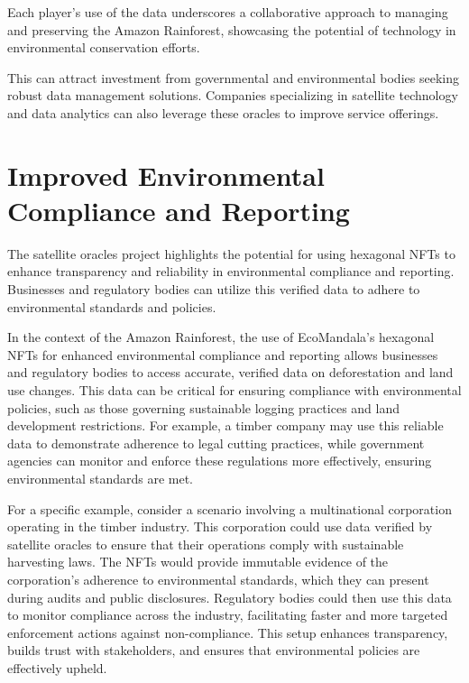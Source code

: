 \documentclass{scrreport}
\begin{document}
Each player's use of the data underscores a collaborative approach to managing and preserving the Amazon Rainforest, showcasing the potential of technology in environmental conservation efforts.

This can attract investment from governmental and environmental bodies seeking robust data management solutions. Companies specializing in satellite technology and data analytics can also leverage these oracles to improve service offerings.

\section{Improved Environmental Compliance and Reporting}

The satellite oracles project highlights the potential for using hexagonal NFTs to enhance transparency and reliability in environmental compliance and reporting. Businesses and regulatory bodies can utilize this verified data to adhere to environmental standards and policies.

In the context of the Amazon Rainforest, the use of EcoMandala’s hexagonal NFTs for enhanced environmental compliance and reporting allows businesses and regulatory bodies to access accurate, verified data on deforestation and land use changes. This data can be critical for ensuring compliance with environmental policies, such as those governing sustainable logging practices and land development restrictions. For example, a timber company may use this reliable data to demonstrate adherence to legal cutting practices, while government agencies can monitor and enforce these regulations more effectively, ensuring environmental standards are met.

For a specific example, consider a scenario involving a multinational corporation operating in the timber industry. This corporation could use data verified by satellite oracles to ensure that their operations comply with sustainable harvesting laws. The NFTs would provide immutable evidence of the corporation's adherence to environmental standards, which they can present during audits and public disclosures. Regulatory bodies could then use this data to monitor compliance across the industry, facilitating faster and more targeted enforcement actions against non-compliance. This setup enhances transparency, builds trust with stakeholders, and ensures that environmental policies are effectively upheld.
\end{document}
